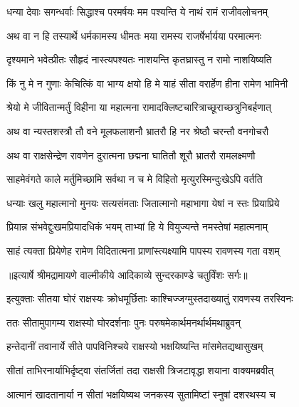 \twolineshloka
{धन्या देवाः सगन्धर्वाः सिद्धाश्च परमर्षयः}
{मम पश्यन्ति ये नाथं रामं राजीवलोचनम्} %

\twolineshloka
{अथ वा न हि तस्यार्थे धर्मकामस्य धीमतः}
{मया रामस्य राजर्षेर्भार्यया परमात्मनः} %

\twolineshloka
{दृश्यमाने भवेत्प्रीतः सौहृदं नास्त्यपश्यतः}
{नाशयन्ति कृतघ्रास्तु न रामो नाशयिष्यति} %

\twolineshloka
{किं नु मे न गुणाः केचित्किं वा भाग्य क्षयो हि मे}
{याहं सीता वरार्हेण हीना रामेण भामिनी} %

\twolineshloka
{श्रेयो मे जीवितान्मर्तुं विहीना या महात्मना}
{रामादक्लिष्टचारित्राच्छूराच्छत्रुनिबर्हणात्} %

\twolineshloka
{अथ वा न्यस्तशस्त्रौ तौ वने मूलफलाशनौ}
{भ्रातरौ हि नर श्रेष्ठौ चरन्तौ वनगोचरौ} %

\twolineshloka
{अथ वा राक्षसेन्द्रेण रावणेन दुरात्मना}
{छद्मना घातितौ शूरौ भ्रातरौ रामलक्ष्मणौ} %

\twolineshloka
{साहमेवंगते काले मर्तुमिच्छामि सर्वथा}
{न च मे विहितो मृत्युरस्मिन्दुःखेऽपि वर्तति} %

\twolineshloka
{धन्याः खलु महात्मानो मुनयः सत्यसंमताः}
{जितात्मानो महाभागा येषां न स्तः प्रियाप्रिये} %

\twolineshloka
{प्रियान्न संभवेद्दुःखमप्रियादधिकं भयम्}
{ताभ्यां हि ये वियुज्यन्ते नमस्तेषां महात्मनाम्} %

\twolineshloka
{साहं त्यक्ता प्रियेणेह रामेण विदितात्मना}
{प्राणांस्त्यक्ष्यामि पापस्य रावणस्य गता वशम्} %


{॥इत्यार्षे श्रीमद्रामायणे वाल्मीकीये आदिकाव्ये सुन्दरकाण्डे चतुर्विंशः सर्गः॥}


\twolineshloka
{इत्युक्ताः सीतया घोरं राक्षस्यः क्रोधमूर्छिताः}
{काश्चिज्जग्मुस्तदाख्यातुं रावणस्य तरस्विनः} %

\twolineshloka
{ततः सीतामुपागम्य राक्षस्यो घोरदर्शनाः}
{पुनः परुषमेकार्थमनर्थार्थमथाब्रुवन्} %

\twolineshloka
{हन्तेदानीं तवानार्ये सीते पापविनिश्चये}
{राक्षस्यो भक्षयिष्यन्ति मांसमेतद्यथासुखम्} %

\twolineshloka
{सीतां ताभिरनार्याभिर्दृष्ट्वा संतर्जितां तदा}
{राक्षसी त्रिजटावृद्धा शयाना वाक्यमब्रवीत्} %

\twolineshloka
{आत्मानं खादतानार्या न सीतां भक्षयिष्यथ}
{जनकस्य सुतामिष्टां स्नुषां दशरथस्य च} %


